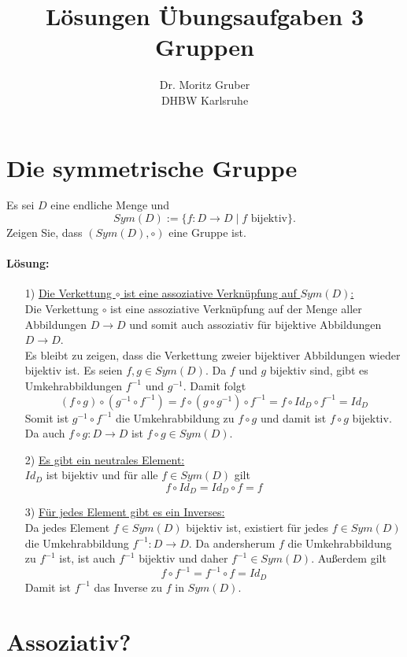 \documentclass[
				a4paper,
				10pt
			]
			{scrartcl}
\author{Dr. Moritz Gruber\\ DHBW Karlsruhe}
\title{L\"osungen \"Ubungsaufgaben 3\\ 
	Gruppen
}
\date{}
\begin{document}
\maketitle
\section{Die symmetrische Gruppe}
Es sei $D$ eine endliche Menge und 
$$
Sym(D):=\{f:D \to D \mid f \text{ bijektiv}\}.
$$
Zeigen Sie, dass $(Sym(D),\circ)$ eine Gruppe ist.
\paragraph{L\"osung:}
\begin{itemize}
\item[1)] \underline{Die Verkettung $\circ$ ist eine assoziative Verkn\"upfung auf $Sym(D)$:}\\
Die Verkettung $\circ$ ist eine assoziative Verkn\"upfung auf der Menge aller Abbildungen $D \to D$ und somit auch assoziativ f\"ur bijektive Abbildungen $D \to D$.\\
Es bleibt zu zeigen, dass die Verkettung zweier bijektiver Abbildungen wieder bijektiv ist.
Es seien $f,g \in Sym(D)$. Da $f$ und $g$ bijektiv sind, gibt es Umkehrabbildungen $f^{-1}$ und $g^{-1}$. Damit folgt
$$
(f \circ g) \circ (g^{-1} \circ f^{-1})=f \circ (g \circ g^{-1}) \circ f^{-1}=f\circ Id_D \circ f^{-1}=Id_D
$$
Somit ist $g^{-1} \circ f^{-1}$ die Umkehrabbildung zu  $f \circ g$ und damit ist $f \circ g$ bijektiv. Da auch $f\circ g: D \to D$ ist $f\circ g \in Sym(D)$.

\item[2)] \underline{Es gibt ein neutrales Element:}\\
$Id_D$ ist bijektiv und f\"ur alle $f \in Sym(D)$ gilt
$$
f \circ Id_D = Id_D \circ f = f
$$

\item[3)] \underline{F\"ur jedes Element gibt es ein Inverses:}\\
Da jedes Element $f\in Sym(D)$ bijektiv ist, existiert f\"ur jedes $f \in Sym(D)$ die Umkehrabbildung $f^{-1}:D \to D$. Da andersherum $f$ die Umkehrabbildung zu $f^{-1}$ ist, ist auch $f^{-1}$ bijektiv und daher $f^{-1}\in Sym(D)$. Au\ss erdem gilt
$$
f \circ f^{-1} = f^{-1} \circ f = Id_D
$$
Damit ist $f^{-1}$ das Inverse zu $f$ in $Sym(D)$.
\end{itemize}

\section{Assoziativ?}
\end{document}
